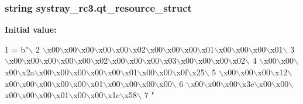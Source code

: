 \subsubsection[{qt\+\_\+resource\+\_\+struct}]{\setlength{\rightskip}{0pt plus 5cm}string systray\+\_\+rc3.\+qt\+\_\+resource\+\_\+struct}\label{namespacesystray__rc3_af7a4be8d5557b5cb03a5933c6c074fd0}
{\bfseries Initial value\+:}
\begin{DoxyCode}
1 = b\textcolor{stringliteral}{"\(\backslash\)}
2 \textcolor{stringliteral}{\(\backslash\)x00\(\backslash\)x00\(\backslash\)x00\(\backslash\)x00\(\backslash\)x00\(\backslash\)x02\(\backslash\)x00\(\backslash\)x00\(\backslash\)x00\(\backslash\)x01\(\backslash\)x00\(\backslash\)x00\(\backslash\)x00\(\backslash\)x01\(\backslash\)}
3 \textcolor{stringliteral}{\(\backslash\)x00\(\backslash\)x00\(\backslash\)x00\(\backslash\)x00\(\backslash\)x00\(\backslash\)x02\(\backslash\)x00\(\backslash\)x00\(\backslash\)x00\(\backslash\)x03\(\backslash\)x00\(\backslash\)x00\(\backslash\)x00\(\backslash\)x02\(\backslash\)}
4 \textcolor{stringliteral}{\(\backslash\)x00\(\backslash\)x00\(\backslash\)x00\(\backslash\)x2a\(\backslash\)x00\(\backslash\)x00\(\backslash\)x00\(\backslash\)x00\(\backslash\)x00\(\backslash\)x01\(\backslash\)x00\(\backslash\)x00\(\backslash\)x0f\(\backslash\)x25\(\backslash\)}
5 \textcolor{stringliteral}{\(\backslash\)x00\(\backslash\)x00\(\backslash\)x00\(\backslash\)x12\(\backslash\)x00\(\backslash\)x00\(\backslash\)x00\(\backslash\)x00\(\backslash\)x00\(\backslash\)x01\(\backslash\)x00\(\backslash\)x00\(\backslash\)x00\(\backslash\)x00\(\backslash\)}
6 \textcolor{stringliteral}{\(\backslash\)x00\(\backslash\)x00\(\backslash\)x00\(\backslash\)x3e\(\backslash\)x00\(\backslash\)x00\(\backslash\)x00\(\backslash\)x00\(\backslash\)x00\(\backslash\)x01\(\backslash\)x00\(\backslash\)x00\(\backslash\)x1c\(\backslash\)x58\(\backslash\)}
7 \textcolor{stringliteral}{"}
\end{DoxyCode}

